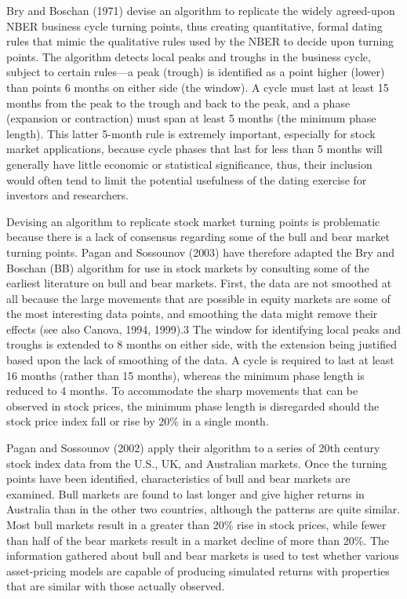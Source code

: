 \documentclass[]{book}
\begin{document}
Bry and Boschan (1971) devise an algorithm to replicate the widely agreed-upon NBER business cycle turning points, thus creating quantitative, formal dating rules that mimic the qualitative rules used by the NBER to decide upon turning points. The algorithm detects local peaks and troughs in the business cycle, subject to certain rules---a peak (trough) is identified as a point higher (lower) than points 6 months on either side (the window). A cycle must last at least 15 months from the peak to the trough and back to the peak, and a phase (expansion or contraction) must span at least 5 months (the minimum phase length). This latter 5-month rule is extremely important, especially for stock market applications, because cycle phases that last for less than 5 months will generally have little economic or statistical significance, thus, their inclusion would often tend to limit the potential usefulness of the dating exercise for investors and researchers.

Devising an algorithm to replicate stock market turning points is problematic because there is a lack of consensus regarding some of the bull and bear market turning points. Pagan and Sossounov (2003) have therefore adapted the Bry and Boschan (BB) algorithm for use in stock markets by consulting some of the earliest literature on bull and bear markets. First, the data are not smoothed at all because the large movements that are possible in equity markets are some of the most interesting data points, and smoothing the data might remove their effects (see also Canova, 1994, 1999).3 The window for identifying local peaks and troughs is extended to 8 months on either side, with the extension being justified based upon the lack of smoothing of the data. A cycle is required to last at least 16 months (rather than 15 months), whereas the minimum phase length is reduced to 4 months. To accommodate the sharp movements that can be observed in stock prices, the minimum phase length is disregarded should the stock price index fall or rise by 20\% in a single month.

Pagan and Sossounov (2002) apply their algorithm to a series of 20th century stock index data from the U.S., UK, and Australian markets. Once the turning points have been identified, characteristics of bull and bear markets are examined. Bull markets are found to last longer and give higher returns in Australia than in the other two countries, although the patterns are quite similar. Most bull markets result in a greater than 20\% rise in stock prices, while fewer than half of the bear markets result in a market decline of more than 20\%. The information gathered about bull and bear markets is used to test whether various asset-pricing models are capable of producing simulated returns with properties that are similar with those actually observed.
\end{document}
